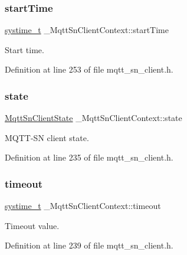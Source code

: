 \subsubsection{\texorpdfstring{start\+Time}{startTime}}
{\footnotesize\ttfamily \hyperlink{compiler__port_8h_ae3e32a98d431a02106616da3071832dd}{systime\+\_\+t} \+\_\+\+Mqtt\+Sn\+Client\+Context\+::start\+Time}



Start time. 



Definition at line 253 of file mqtt\+\_\+sn\+\_\+client.\+h.

\mbox{\label{struct__MqttSnClientContext_a5e459cf9b6b172aebdfdeaaa27159ffd}} 
\subsubsection{\texorpdfstring{state}{state}}
{\footnotesize\ttfamily \hyperlink{mqtt__sn__client_8h_ac2c5b1752aff9aadfd267c2a11535071}{Mqtt\+Sn\+Client\+State} \+\_\+\+Mqtt\+Sn\+Client\+Context\+::state}



M\+Q\+T\+T-\/\+SN client state. 



Definition at line 235 of file mqtt\+\_\+sn\+\_\+client.\+h.

\mbox{\label{struct__MqttSnClientContext_a50420f8ba7729f44240ed89dba3354c0}} 
\subsubsection{\texorpdfstring{timeout}{timeout}}
{\footnotesize\ttfamily \hyperlink{compiler__port_8h_ae3e32a98d431a02106616da3071832dd}{systime\+\_\+t} \+\_\+\+Mqtt\+Sn\+Client\+Context\+::timeout}



Timeout value. 



Definition at line 239 of file mqtt\+\_\+sn\+\_\+client.\+h.

